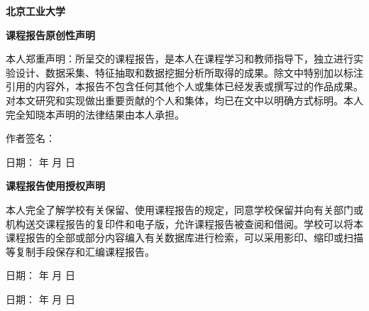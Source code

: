 
\setlength{\baselineskip}{23pt}
\selectfont

\begin{center}
    {\sanhao\song\bfseries 北\hspace{0.5em}京\hspace{0.5em}工\hspace{0.5em}业\hspace{0.5em}大\hspace{0.5em}学 \par}
    \vspace{0.5em}
    {\xiaosi\song\bfseries 课程报告原创性声明 \par}
\end{center}

\par
\indent 本人郑重声明：所呈交的课程报告，是本人在课程学习和教师指导下，独立进行实验设计、数据采集、特征抽取和数据挖掘分析所取得的成果。除文中特别加以标注引用的内容外，本报告不包含任何其他个人或集体已经发表或撰写过的作品成果。对本文研究和实现做出重要贡献的个人和集体，均已在文中以明确方式标明。本人完全知晓本声明的法律结果由本人承担。

\par \vspace{1em}
\noindent \hspace*{2em} 作者签名：
\par
\noindent \hspace*{2em} 日期：\hspace{2em} 年 \hspace{1em} 月 \hspace{1em} 日

\par \vspace{3em}

\begin{center}
    {\xiaosi\song\bfseries 课程报告使用授权声明 \par}
\end{center}

\par
\indent 本人完全了解学校有关保留、使用课程报告的规定，同意学校保留并向有关部门或机构送交课程报告的复印件和电子版，允许课程报告被查阅和借阅。学校可以将本课程报告的全部或部分内容编入有关数据库进行检索，可以采用影印、缩印或扫描等复制手段保存和汇编课程报告。

\par \vspace{1em}
\noindent
{} 日期：\hspace{2em} 年 \hspace{1em} 月 \hspace{1em} 日
\par
\noindent
{} 日期：\hspace{2em} 年 \hspace{1em} 月 \hspace{1em} 日

\vfill
{}
\clearpage
